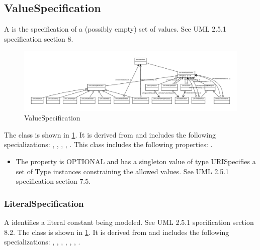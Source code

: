 %
\normalsize%
\subsection{ValueSpecification}%
\label{sec:uml:ValueSpecification}%
A  is the specification of a (possibly empty) set of values. See UML 2.5.1 specification section 8.%
\newline%
\linebreak%


\begin{figure}[h!]%
\centering%
\includegraphics[width=1.0\textwidth]{uml_classes/ValueSpecification_abstraction_hierarchy.pdf}%
\caption{ValueSpecification}%
\label{fig:ValueSpecification}%
\end{figure}

%
The  class is shown in \ref{fig:ValueSpecification}. It is derived from  and includes the following specializations: , , , , . %
This class includes the following properties: . %
\begin{itemize}%
\item%
The  property is OPTIONAL and has a singleton value of type URISpecifies a set of Type instances constraining the allowed values. See UML 2.5.1 specification section 7.5.%
\end{itemize}%
\subsubsection{LiteralSpecification}%
\label{sec:uml:LiteralSpecification}%
A  identifies a literal constant being modeled. See UML 2.5.1 specification section 8.2.%
\newline%
\linebreak%
The  class is shown in \ref{fig:ValueSpecification}. It is derived from  and includes the following specializations: , , , , , , . %
%
